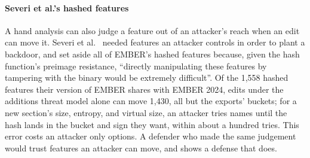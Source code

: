 \paragraph{Severi et al.'s hashed features}
A hand analysis can also judge a feature out of an attacker's reach when an edit can move it. Severi et al.~\cite{severi2021explanation} needed features an
attacker controls in order to plant a backdoor, and set aside all of EMBER's hashed features because, given the hash
function's preimage resistance, ``directly manipulating these features by tampering with the binary would be extremely
difficult''. Of the 1,558 hashed features their version of EMBER shares with EMBER 2024, edits under the additions
threat model alone can move 1,430, all but the exports' buckets; for a new section's size, entropy, and virtual size,
an attacker tries names until the hash lands in the bucket and sign they want, within about a hundred tries. This
error costs an attacker only options. A defender who made the same judgement would trust features an attacker can
move, and  shows a defense that does.
